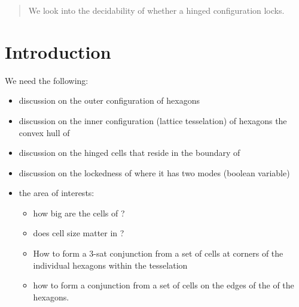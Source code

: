 \begin{abstract}
We look into the decidability of whether a hinged configuration locks.
\end{abstract}
\section{Introduction}
We need the following:
\begin{itemize}
\item[\rn{1}] discussion on the outer configuration of hexagons
\item[\rn{2}] discussion on the inner configuration (lattice tesselation) of hexagons the convex hull of 
\item[\rn{3}] discussion on the hinged cells that reside in the boundary of 
\item[\rn{4}] discussion on the lockedness of  where it has two modes (boolean variable)
\item[\rn{5}] the area of interests:
\begin{itemize}
\item how big are the cells of ?
\item does cell size matter in ?
\item How to form a 3-sat conjunction from a set of cells at corners of the individual hexagons within the tesselation
\item how to form a conjunction from a set of cells on the edges of the of the hexagons.
\end{itemize} 
\end{itemize}  